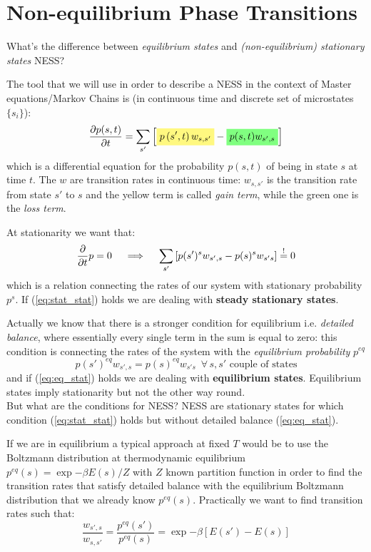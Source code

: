 \documentclass[\main/main.tex]{subfiles}
\begin{document}
\chapter{Non-equilibrium Phase Transitions}
What's the difference between \textit{equilibrium states} and \textit{(non-equilibrium) stationary states} NESS?

The tool that we will use in order to describe a NESS in the context of Master equations/Markov Chains is (in continuous time and discrete set of microstates $\{s_i\}$):
\begin{equation}
    \frac{\partial p(s, t)}{\partial t}=\sum_{s^{\prime}}\left[\hlc{yellow}{p\left(s^{\prime}, t\right) w_{s, s^{\prime}}}-\hlc{green}{p(s, t) w_{s^{\prime}, s}}\right]
\end{equation}
which is a differential equation for the probability $p(s,t)$ of being in state $s$ at time $t$. The $w$ are transition rates in continuous time: $w_{s,s'}$ is the transition rate from state $s'$ to $s$ and the yellow term is called \textit{gain term}, while the green one is the \textit{loss term}.

At stationarity we want that:
\begin{equation}
    \frac{\partial}{\partial t}p=0 \quad\implies\quad \sum_{s'}\left[p(s')^s w_{s',s}-p(s)^s w_{s's}\right]\overset{!}{=} 0
    \label{eq:stat_stat}
\end{equation}
which is a relation connecting the rates of our system with stationary probability $p^s$. If (\ref{eq:stat_stat}) holds we are dealing with \textbf{steady stationary states}.

Actually we know that there is a stronger condition for equilibrium i.e. \textit{detailed balance}, where essentially every single term in the sum is equal to zero: this condition is connecting the rates of the system with the \textit{equilibrium probability} $p^{eq}$
\begin{equation}
    p(s')^{eq} w_{s',s}=p(s)^{eq} w_{s's} \,\,\, \forall \, s,s' \,\, \text{couple of states}
    \label{eq:eq_stat}
\end{equation}
and if (\ref{eq:eq_stat}) holds we are dealing with \textbf{equilibrium states}. Equilibrium states imply stationarity but not the other way round. \\

But what are the conditions for NESS? NESS are stationary states for which condition (\ref{eq:stat_stat}) holds but without detailed balance (\ref{eq:eq_stat}).

If we are in equilibrium a typical approach at fixed $T$ would be to use the Boltzmann distribution at thermodynamic equilibrium $p^{eq}(s)=\exp{-\beta E(s)/Z}$ with $Z$ known partition function in order to find the transition rates that satisfy detailed balance with the equilibrium Boltzmann distribution that we already know $p^{eq}(s)$. Practically we want to find transition rates such that:
\begin{equation}
    \frac{w_{s',s}}{w_{s,s'}}=\frac{p^{eq}(s')}{p^{eq}(s)}=\exp{-\beta[E(s')-E(s)]}
\end{equation}
\end{document}
